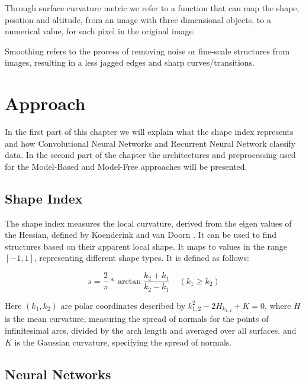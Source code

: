 \documentclass[12pt]{article}
\theoremstyle{definition}
\begin{document}
	Through surface curvature metric we refer to a function that can map the shape, position and altitude, from an image with three dimensional objects, to a numerical value, for each pixel in the original image.

	Smoothing refers to the process of removing noise or fine-scale structures from images, resulting in a less jagged edges and sharp curves/transitions.

	\clearpage

	\section{Approach}
	\vspace{1cm}

	In the first part of this chapter we will explain what the shape index represents and how Convolutional Neural Networks and Recurrent Neural Network classify data. In the second part of the chapter the architectures and preprocessing used for the Model-Based and Model-Free approaches will be presented.

	\subsection{Shape Index}
	The shape index measures the local curvature, derived from the eigen values of the Hessian, defined by Koenderink and van Doorn \cite{shape-index}. It can be used to find structures based on their apparent local shape. It maps to values in the range $[-1, 1]$, representing different shape types. It is defined as follows:

	\begin{equation*}
	s=\frac{2}{\pi}*\arctan{\frac{k_2+k_1}{k_2-k_1}} \;\;\;\;  (k_1 \geq k_2)
	\end{equation*}

	Here $(k_1, k_2)$ are polar coordinates described by $k_{1,2}^2-2H_{k_{1,2}}+K=0$, where $H$ is the mean curvature, measuring the spread of normals for the points of infinitesimal arcs, divided by the arch length and averaged over all surfaces, and $K$ is the Gaussian curvature, specifying the spread of normals.

	\subsection{Neural Networks}
\end{document}
